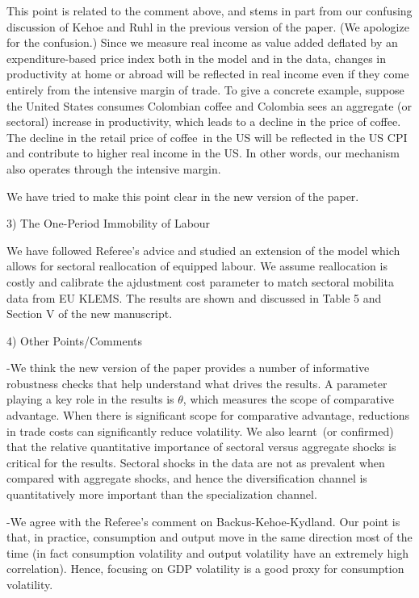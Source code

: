 \documentclass[12pt]{article}
\begin{document}
This point is related to the comment above, and stems in part from our
confusing discussion of Kehoe and Ruhl in the previous version of the paper.
(We apologize for the confusion.) Since we measure real income as value
added deflated by an expenditure-based price index both in the model and in
the data, changes in productivity at home or abroad will be reflected in
real income even if they come entirely from the intensive margin of trade.
To give a concrete example, suppose the United States consumes Colombian
coffee and Colombia sees an aggregate (or sectoral) increase in
productivity, which leads to a decline in the price of coffee. The decline
in the retail price of coffee\ in the US will be reflected in the US CPI and
contribute to higher real income in the US. In other words, our mechanism
also operates through the intensive margin.

We have tried to make this point clear in the new version of the paper.

\bigskip

3) The One-Period Immobility of Labour

We have followed Referee's advice and studied an extension of the model
which allows for sectoral reallocation of equipped labour. We assume
reallocation is costly and calibrate the ajdustment cost parameter to match
sectoral mobilita data from EU KLEMS. The results are shown and discussed in
Table 5 and Section V of the new manuscript.

\bigskip

4) Other Points/Comments

-We think the new version of the paper provides a number of informative
robustness checks that help understand what drives the results. A parameter
playing a key role in the results is $\theta $, which measures the scope of
comparative advantage. When there is significant scope for comparative
advantage, reductions in trade costs can significantly reduce volatility. We
also learnt\ (or confirmed) that the relative quantitative importance of
sectoral versus aggregate shocks is critical for the results. Sectoral
shocks in the data are not as prevalent when compared with aggregate shocks,
and hence the diversification channel is quantitatively more important than
the specialization channel.

-We agree with the Referee's comment on Backus-Kehoe-Kydland. Our point is
that, in practice, consumption and output move in the same direction most of
the time (in fact consumption volatility and output volatility have an
extremely high correlation). Hence, focusing on GDP volatility is a good
proxy for consumption volatility.
\end{document}

